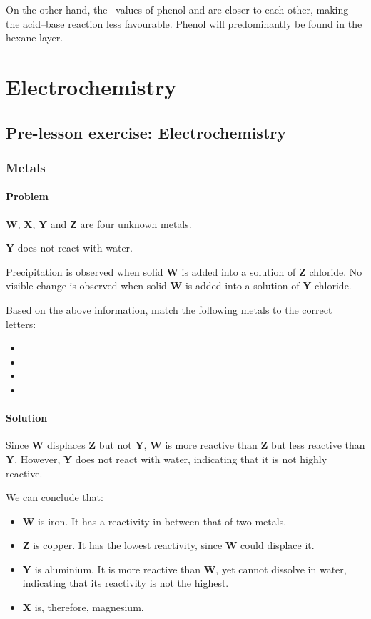 \documentclass[12pt, a4paper, twoside]{pancake-book}
\renewcommand*{\bf}[1]{\textbf{#1}}
\begin{document}
On the other hand, the \pKa\ values of phenol and  are closer
to each other, making the acid--base reaction less favourable. {\color{accent}
		Phenol will predominantly be found in the hexane layer.}


\chapter{Electrochemistry}
\section{Pre-lesson exercise: Electrochemistry}
\subsection{Metals}
\subsubsection{Problem}
\bf{W}, \bf{X}, \bf{Y} and \bf{Z} are four unknown metals.

\bf{Y} does not react with water.

Precipitation is observed when solid \bf{W} is added into a solution of \bf{Z}
chloride.  No visible change is observed when solid \bf{W} is added into a solution
of \bf{Y} chloride.

Based on the above information, match the following metals to the correct
letters:
\begin{itemize}
	\item {}
	\item {}
	\item {}
	\item {}
\end{itemize}

\subsubsection{Solution}

Since \bf{W} displaces \bf{Z} but not \bf{Y}, \bf{W} is more reactive than \bf{Z}
but less reactive than \bf{Y}. However, \bf{Y} does not react with water,
indicating that it is not highly reactive.

We can conclude that:
\begin{itemize}
	\item {\color{accent} \bf{W} is iron}. It has a reactivity in between that of two metals.
	\item {\color{accent} \bf{Z} is copper}. It has the lowest reactivity, since \bf{W} could displace it.
	\item {\color{accent} \bf{Y} is aluminium}. It is more reactive than \bf{W}, yet cannot dissolve in water, indicating that its reactivity is not the highest.
	\item {\color{accent} \bf{X} is, therefore, magnesium}.
\end{itemize}
\end{document}
